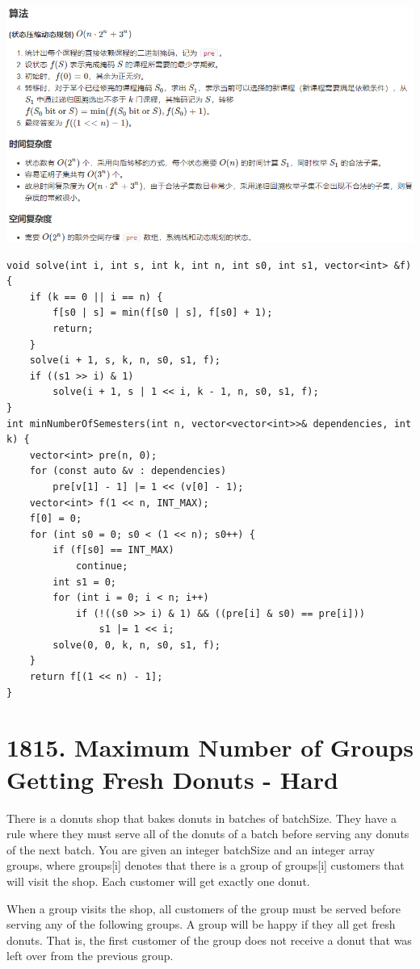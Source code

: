 \documentclass[9pt, b5paaper]{book}
\begin{document}
\includegraphics[width=.9\linewidth]{./pic/courseII.png}
\begin{verbatim}
void solve(int i, int s, int k, int n, int s0, int s1, vector<int> &f) {
    if (k == 0 || i == n) {
        f[s0 | s] = min(f[s0 | s], f[s0] + 1);
        return;
    }
    solve(i + 1, s, k, n, s0, s1, f);
    if ((s1 >> i) & 1)
        solve(i + 1, s | 1 << i, k - 1, n, s0, s1, f);
}
int minNumberOfSemesters(int n, vector<vector<int>>& dependencies, int k) {
    vector<int> pre(n, 0);
    for (const auto &v : dependencies)
        pre[v[1] - 1] |= 1 << (v[0] - 1);
    vector<int> f(1 << n, INT_MAX);
    f[0] = 0;
    for (int s0 = 0; s0 < (1 << n); s0++) {
        if (f[s0] == INT_MAX)
            continue;
        int s1 = 0;
        for (int i = 0; i < n; i++)
            if (!((s0 >> i) & 1) && ((pre[i] & s0) == pre[i]))
                s1 |= 1 << i;
        solve(0, 0, k, n, s0, s1, f);
    }
    return f[(1 << n) - 1];
}
\end{verbatim}

\section{1815. Maximum Number of Groups Getting Fresh Donuts - Hard}
\label{sec-11-4}
There is a donuts shop that bakes donuts in batches of batchSize. They have a rule where they must serve all of the donuts of a batch before serving any donuts of the next batch. You are given an integer batchSize and an integer array groups, where groups[i] denotes that there is a group of groups[i] customers that will visit the shop. Each customer will get exactly one donut.

When a group visits the shop, all customers of the group must be served before serving any of the following groups. A group will be happy if they all get fresh donuts. That is, the first customer of the group does not receive a donut that was left over from the previous group.
\end{document}
